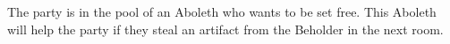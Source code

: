 The party is in the pool of an Aboleth who wants to be set free.
This Aboleth will help the party if they steal an artifact from the Beholder in the next room.
